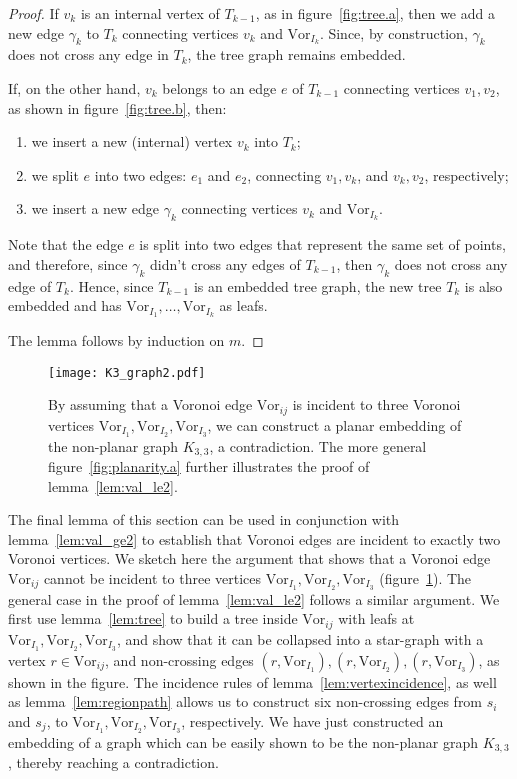 \documentclass[11pt]{article}
\newcommand{\Vor}{\text{Vor}}
\begin{document}
\begin{proof}
If $v_k$ is an internal vertex of $T_{k-1}$, 
	as in figure~\ref{fig:tree.a},
	then we add a new edge $\gamma_k$ to $T_k$ connecting vertices $v_k$ and $\Vor_{I_k}$. 
Since, by construction, $\gamma_k$ does not cross any edge in $T_k$, the tree graph remains embedded. 



If, on the other hand, $v_k$ belongs to an edge $e$ of $T_{k-1}$ connecting vertices $v_1,v_2$, 
	as shown in figure~\ref{fig:tree.b}, 
	then:
	\begin{enumerate}
	\item we insert a new (internal) vertex $v_k$ into $T_k$;
	\item we split $e$ into two edges: 
		$e_1$ and $e_2$, connecting $v_1,v_k$, and $v_k,v_2$, respectively; 
	\item we insert a new edge $\gamma_k$ connecting vertices $v_k$ and $\Vor_{I_k}$. 
	\end{enumerate}
Note that 
	the edge $e$ is split into two edges that represent the same set of points, 
	and therefore, since $\gamma_k$ didn't cross any edges of $T_{k-1}$, 
	then $\gamma_k$ does not cross any edge of $T_k$. 
Hence, since $T_{k-1}$ is an embedded tree graph, 
	the new tree $T_k$ is also embedded
	 and has $\Vor_{I_1},\dots,\Vor_{I_k}$ as leafs. 

The lemma follows by induction on $m$.  
\end{proof}


\begin{figure}[!h]
   \centering
\texttt{[image: K3\_graph2.pdf]}
   \caption{By assuming that a Voronoi edge $\Vor_{ij}$ is incident to three Voronoi vertices $\Vor_{I_1},\Vor_{I_2},\Vor_{I_3}$, 
   		we can construct a planar embedding of the non-planar graph $K_{3,3}$, a contradiction. 
		The more general figure~\ref{fig:planarity.a} 
			 further illustrates the proof of lemma~\ref{lem:val_le2}. }
\label{fig:K33}
\end{figure}

The final lemma of this section can be used in conjunction with lemma~\ref{lem:val_ge2} 
	to establish that Voronoi edges are incident to exactly two Voronoi vertices. 
We sketch here the argument that shows that a Voronoi edge $\Vor_{ij}$ cannot 
	be incident to three vertices $\Vor_{I_1},\Vor_{I_2},\Vor_{I_3}$ (figure~\ref{fig:K33}). 
The general case in the proof of lemma~\ref{lem:val_le2} follows a similar argument. 
We first use lemma~\ref{lem:tree} to build a tree inside $\Vor_{ij}$ with leafs at $\Vor_{I_1},\Vor_{I_2},\Vor_{I_3}$, 
	and show that it can be collapsed into a star-graph with a vertex $r\in\Vor_{ij}$, and non-crossing edges 
		$(r,\Vor_{I_1}), (r,\Vor_{I_2}), (r,\Vor_{I_3})$, as shown in the figure. 
The incidence rules of lemma~\ref{lem:vertexincidence}, as well as lemma~\ref{lem:regionpath} allows us 
	to construct six non-crossing edges from $s_i$ and $s_j$, to $\Vor_{I_1},\Vor_{I_2},\Vor_{I_3}$, respectively. 
We have just constructed an embedding of a graph which can be easily shown to be the non-planar graph $K_{3,3}$, 
	thereby reaching a contradiction. 
\end{document}
